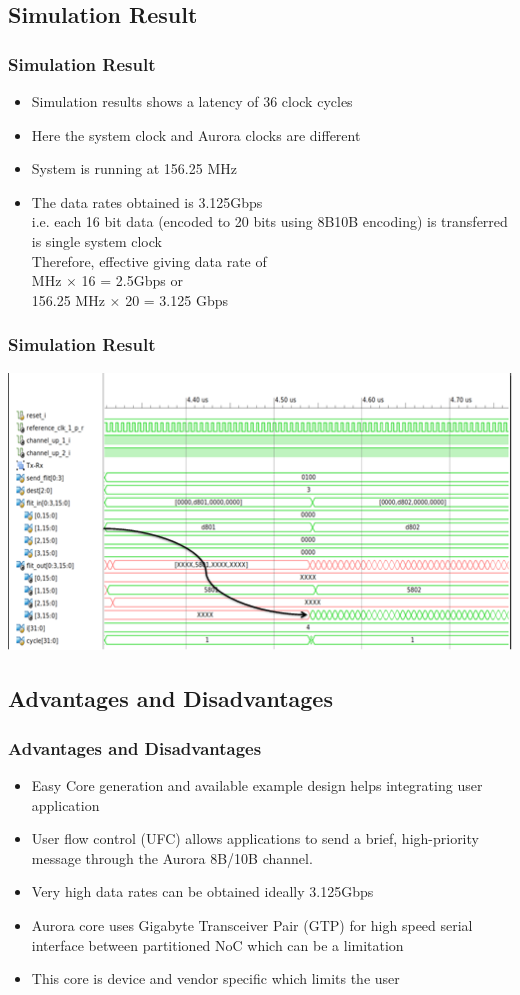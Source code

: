 \subsection{Simulation Result}
\begin{frame}
\frametitle{Simulation Result}
\begin{itemize}
\item Simulation results shows a latency of 36 clock cycles
\item Here the system clock and Aurora clocks are different
\item System is running at 156.25 MHz 
\item The data rates obtained is 3.125Gbps \\
i.e. each 16 bit data (encoded to 20 bits using 8B10B encoding) is transferred is single system clock \\
Therefore, effective giving data rate of \\
 MHz $\times$ 16 = 2.5Gbps or \\
156.25 MHz $\times$ 20 = 3.125 Gbps
\end{itemize}
\end{frame}

\begin{frame}
\frametitle{Simulation Result}
	\centering
	\includegraphics[scale=0.7]{./figs/AuroraSimulation}
\end{frame}

\subsection{Advantages and Disadvantages}
\begin{frame}
\frametitle{Advantages and Disadvantages}
\begin{itemize}
\item{Easy Core generation and available example design helps integrating user application}
\item{User flow control (UFC) allows applications to send a brief, high-priority message through the Aurora 8B/10B channel.}
\item{Very high data rates can be obtained ideally 3.125Gbps}
\item{Aurora core uses Gigabyte Transceiver Pair (GTP) for high speed serial interface between partitioned NoC which can be a limitation}
\item{This core is device and vendor specific which limits the user}
\end{itemize}
\end{frame}


